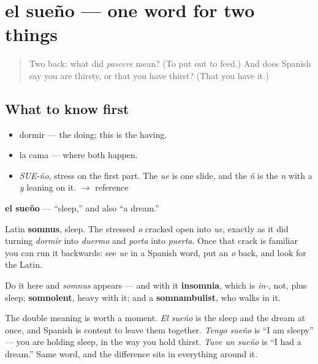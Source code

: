 \section[el sueño]{el sueño — one word for two things}

\label{lesson:ES-C300-sueno}



\begin{quote}
Two back: what did \emph{pascere} mean? (To put out to feed.) And does Spanish say you are thirsty, or that you have thirst? (That you have it.)
\end{quote}

\subsection*{What to know first}
\begin{itemize}
\raggedright
  \item dormir — the doing; this is the having.
  \item la cama — where both happen.
\end{itemize}

\begin{sounds}
\begin{itemize}
\raggedright
  \item \emph{SUE-ño}, stress on the first part. The \emph{ue} is one slide, and the \emph{ñ} is the \emph{n} with a \emph{y} leaning on it. $\to$ reference
\end{itemize}
\end{sounds}

\begin{cousinweb}
\textbf{el sueño} — \textquotedblleft{}sleep,\textquotedblright{} and also \textquotedblleft{}a dream.\textquotedblright{}

Latin \textbf{somnus}, sleep. The stressed \emph{o} cracked open into \emph{ue}, exactly as it did turning \emph{dormir} into \emph{duermo} and \emph{porta} into \emph{puerta}. Once that crack is familiar you can run it backwards: see \emph{ue} in a Spanish word, put an \emph{o} back, and look for the Latin.

Do it here and \emph{somnus} appears — and with it \textbf{insomnia}, which is \emph{in-}, not, plus sleep; \textbf{somnolent}, heavy with it; and a \textbf{somnambulist}, who walks in it.

The double meaning is worth a moment. \emph{El sueño} is the sleep and the dream at once, and Spanish is content to leave them together. \emph{Tengo sueño} is \textquotedblleft{}I am sleepy\textquotedblright{} — you are holding sleep, in the way you hold thirst. \emph{Tuve un sueño} is \textquotedblleft{}I had a dream.\textquotedblright{} Same word, and the difference sits in everything around it.
\end{cousinweb}

